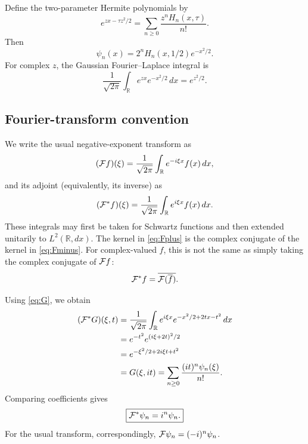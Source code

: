 \documentclass[11pt]{amsart}
\newcommand{\RR}{\mathbb R}
\newcommand{\F}{{\cal F}}
\newcommand{\Fstar}{{\cal F}^{*}}
\newcommand{\dd}{\,dx}
\begin{document}
Define the two-parameter Hermite polynomials by
\begin{equation}\label{eq:Hermite-polynomials}
e^{zx-\tau z^2/2}
=\sum_{n\ge0}\frac{z^n H_n(x,\tau)}{n!}.
\end{equation}
Then
\[
\psi_n(x)=2^nH_n(x,1/2)e^{-x^2/2}.
\]
For complex $z$, the Gaussian Fourier--Laplace integral is
\[
\frac1{\sqrt{2\pi}}\int_{\RR}e^{zx}e^{-x^2/2}\dd=e^{z^2/2}.
\]

\subsection*{Fourier-transform convention}
We write the usual negative-exponent transform as
\begin{equation}\label{eq:Fminus}
(\F f)(\xi)=\frac1{\sqrt{2\pi}}
\int_{\RR}e^{-i\xi x}f(x)\dd,
\end{equation}
and its adjoint (equivalently, its inverse) as
\begin{equation}\label{eq:Fplus}
(\Fstar f)(\xi)=\frac1{\sqrt{2\pi}}
\int_{\RR}e^{i\xi x}f(x)\dd.
\end{equation}
These integrals may first be taken for Schwartz functions and then
extended unitarily to $L^2(\RR,dx)$.
The kernel in \eqref{eq:Fplus} is the complex conjugate of the kernel
in \eqref{eq:Fminus}. For complex-valued $f$, this is not the same as
simply taking the complex conjugate of $\F f$:
\[
\Fstar f=\overline{\F(\overline f)}.
\]

Using \eqref{eq:G}, we obtain
\begin{align}
(\Fstar G)(\xi,t)
&=\frac1{\sqrt{2\pi}}\int_{\RR}
e^{i\xi x}e^{-x^2/2+2tx-t^2}\dd\notag\\
&=e^{-t^2}e^{(i\xi+2t)^2/2}\notag\\
&=e^{-\xi^2/2+2i\xi t+t^2}\label{eq:corrected-mixed-term}\\
&=G(\xi,it)
=\sum_{n\ge0}\frac{(it)^n\psi_n(\xi)}{n!}.\notag
\end{align}
Comparing coefficients gives
\begin{equation}\label{eq:Fourier-Hermite}
\boxed{\Fstar\psi_n=i^n\psi_n.}
\end{equation}
For the usual transform, correspondingly,
$\F\psi_n=(-i)^n\psi_n$.
\end{document}
